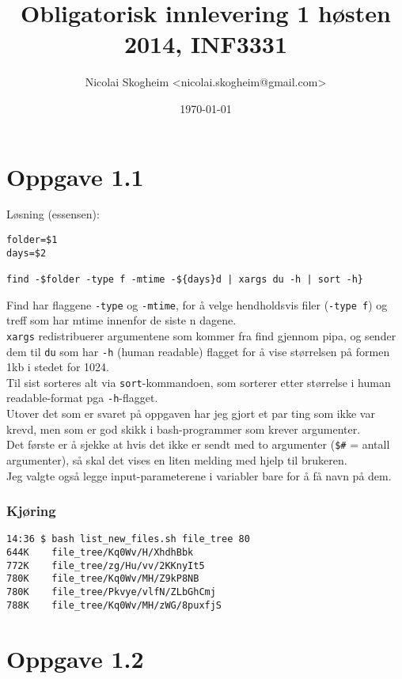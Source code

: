 \documentclass{article}
\title{Obligatorisk innlevering 1 høsten 2014, INF3331}
\author{Nicolai Skogheim <nicolai.skogheim@gmail.com>}
\date{\today}
\newcommand{\code}[1]{\colorbox{codegray}{\texttt{#1}}}
\begin{document}
\maketitle

\section*{Oppgave 1.1}
Løsning (essensen):
\begin{verbatim}
folder=$1
days=$2

find -$folder -type f -mtime -${days}d | xargs du -h | sort -h}
\end{verbatim}


Find har flaggene \code{-type} og \code{-mtime}, for å velge hendholdsvis
filer (\code{-type f}) og treff som har mtime innenfor de siste n dagene.\\

\code{xargs} redistribuerer argumentene som kommer fra find gjennom pipa,
og sender dem til \code{du} som har \code{-h} (human readable) flagget for
å vise størrelsen på formen 1kb i stedet for 1024.\\

Til sist sorteres alt via \code{sort}-kommandoen, som sorterer etter størrelse
i human readable-format pga \code{-h}-flagget.\\

Utover det som er svaret på oppgaven har jeg gjort et par ting som ikke
var krevd, men som er god skikk i bash-programmer som krever argumenter.\\

Det første er å sjekke at hvis det ikke er sendt med to argumenter (\code{\$\#} = antall argumenter),
så skal det vises en liten melding med hjelp til brukeren.\\

Jeg valgte også legge input-parameterene i variabler bare for å få navn på dem.

\subsubsection*{Kjøring}
\begin{Verbatim}
14:36 $ bash list_new_files.sh file_tree 80
644K	file_tree/Kq0Wv/H/XhdhBbk
772K	file_tree/zg/Hu/vv/2KKnyIt5
780K	file_tree/Kq0Wv/MH/Z9kP8NB
780K	file_tree/Pkvye/vlfN/ZLbGhCmj
788K	file_tree/Kq0Wv/MH/zWG/8puxfjS
\end{Verbatim}


\section*{Oppgave 1.2}
\end{document}
